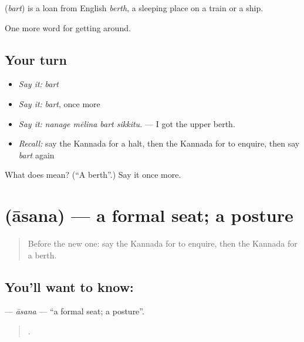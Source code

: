 \begin{cousinweb}
\textbf{} (\emph{bart}) is a loan from English \emph{berth}, a sleeping place on a train or a ship.
\end{cousinweb}

\begin{grammarlens}[title={What you've built}]
One more word for getting around.
\end{grammarlens}

\subsection*{Your turn}
\begin{itemize}
\raggedright
  \item \emph{Say it:} \emph{bart}
  \item \emph{Say it:} \emph{bart}, once more
  \item \emph{Say it:} \emph{nanage mēlina bart sikkitu.} — I got the upper berth.
  \item \emph{Recall:} say the Kannada for a halt, then the Kannada for to enquire, then say \emph{bart} again
\end{itemize}

\begin{tcolorbox}[breakable,colback=teal!4,colframe=teal!35!black,title={Before you move on}]
What does  mean? (\textquotedblleft{}A berth\textquotedblright{}.) Say it once more.
\end{tcolorbox}
\section[\texorpdfstring{\kn{ಆಸನ} (āsana)}{ಆಸನ (āsana)}]{ (āsana) — a formal seat; a posture}

\label{lesson:KA-C435-asana}



\begin{quote}
Before the new one: say the Kannada for to enquire, then the Kannada for a berth.
\end{quote}

\subsection*{You'll want to know: }
\textbf{} — \emph{āsana} — \textquotedblleft{}a formal seat; a posture\textquotedblright{}.

\begin{quote}
    .
\end{quote}

